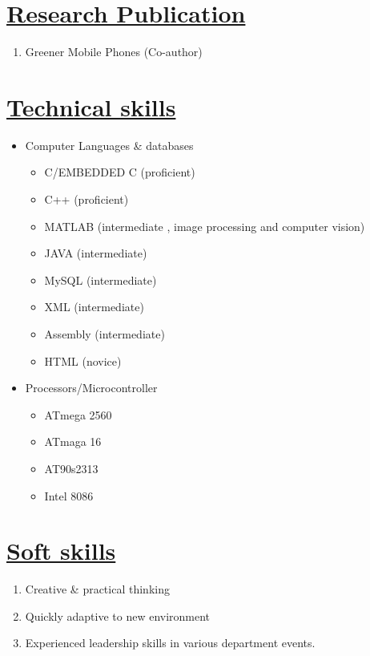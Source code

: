 \documentclass[14pt,a4paper,twoside]{article}
\begin{document}
		
	\section*{\underline{\textbf{Research Publication}}}
		\begin{enumerate}
			\item Greener Mobile Phones (Co-author)
		\end{enumerate}
	
	\section*{\underline{\textbf{Technical skills}}}
		\begin{itemize}
			\item Computer Languages \& databases
			\begin{itemize}
				\item C/EMBEDDED C		(proficient)
				\item C++				(proficient)
				\item MATLAB			(intermediate , image processing and computer vision)
				\item JAVA				(intermediate)
				\item MySQL				(intermediate)
				\item XML				(intermediate)
				\item Assembly 			(intermediate)
				\item HTML				(novice)	
			\end{itemize}
		\item Processors/Microcontroller
		\begin{itemize}
			\item ATmega 2560		
			\item ATmaga 16
			\item AT90s2313
			\item Intel 8086					
		\end{itemize}
		
		\end{itemize}
		
	\section*{\underline{\textbf{Soft skills}}}
		\begin{enumerate}
			\item Creative \& practical thinking 
			\item Quickly adaptive to new environment
			\item Experienced leadership skills in various department events. 
			
		\end{enumerate}
		
\end{document}
